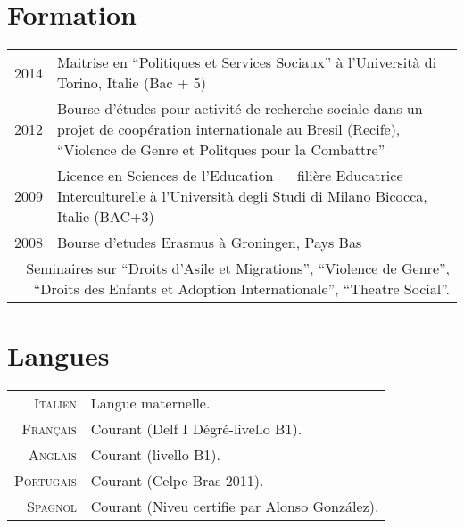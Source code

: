 \documentclass[a4paper,10pt]{article}
\begin{document}
\section{Formation}
\begin{tabular}{rp{}}	
 2014 & Maitrise en ``Politiques et Services Sociaux'' à l'Università di Torino, Italie (Bac + 5)\\
2012& Bourse d'études pour activité de recherche sociale dans un projet de coopération internationale au Bresil (Recife), ``Violence de Genre et Politques pour la Combattre'' \\
2009 & Licence en Sciences de l'Education --- filière Educatrice Interculturelle à l'Università degli Studi di Milano Bicocca, Italie (BAC+3)\\
2008 & Bourse d'etudes Erasmus à Groningen, Pays Bas\\
\multicolumn{2}{p{14cm}}{\footnotesize{Seminaires sur ``Droits d'Asile et Migrations'', ``Violence de Genre'', ``Droits des Enfants et Adoption Internationale'', ``Theatre Social''.}}
\end{tabular}

\section{Langues}
\begin{tabular}{rl}
 \textsc{Italien}&Langue maternelle.\\
 \textsc{Français}& Courant (Delf I Dégré-livello B1).\\
\textsc{Anglais}&Courant (livello B1).\\
\textsc{Portugais}&Courant (Celpe-Bras 2011).\\
\textsc{Spagnol} & Courant (Niveu certifie par Alonso González).
\end{tabular}
\end{document}
